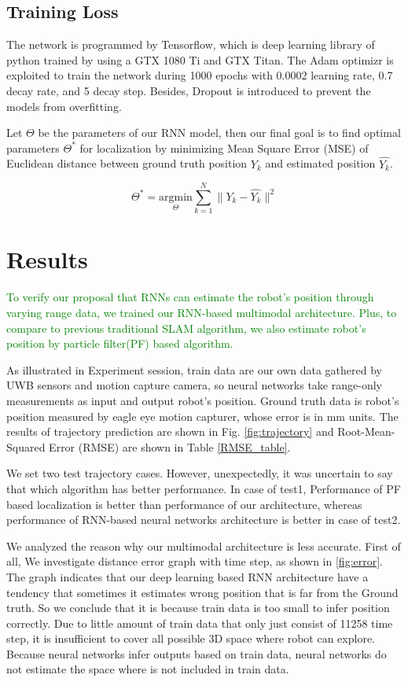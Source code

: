 \documentclass[letterpaper, 10 pt, conference]{ieeeconf}  %
\begin{document}
\subsection{Training Loss}
The network is programmed by Tensorflow, which is deep learning library of python trained by using a GTX 1080 Ti and GTX Titan. The Adam optimizr is exploited to train the network during 1000 epochs with 0.0002 learning rate, 0.7 decay rate, and 5 decay step. Besides, Dropout is introduced to prevent the models from overfitting. 

Let $\Theta$ be the parameters of our RNN model, then our final goal is to find optimal parameters $\Theta^{*}$ for localization by minimizing Mean Square Error (MSE) of Euclidean distance between ground truth position $Y_k$ and estimated position $\hat{Y_k}$.

\begin{equation}
\Theta^{*} = \underset{\Theta}{\mathrm{argmin}} \sum_{k=1}^N \parallel Y_k - \hat{Y_k} \parallel^{2}
\end{equation}  

\section{Results}

 \textcolor{green}{To verify our proposal that RNNs can estimate the robot's position through varying range data, we trained our RNN-based multimodal architecture. Plus, to compare to previous traditional SLAM algorithm, we also estimate robot's position by particle filter(PF) based algorithm.}

 As illustrated in Experiment session, train data are our own data gathered by UWB sensors and motion capture camera, so neural networks take range-only measurements as input and output robot's position. Ground truth data is robot's position measured by eagle eye motion capturer, whose error is in mm units. The results of trajectory prediction are shown in Fig. \ref{fig:trajectory} and Root-Mean-Squared Error (RMSE) are shown in Table \ref{RMSE_table}.

 We set two test trajectory cases. However, unexpectedly, it was uncertain to say that which algorithm has better performance. In case of test1, Performance of PF based localization is better than performance of our architecture, whereas performance of RNN-based neural networks architecture is better in case of test2. 
 
 We analyzed the reason why our multimodal architecture is less accurate. First of all, We investigate distance error graph with time step, as shown in \ref{fig:error}. The graph indicates that our deep learning based RNN architecture have a tendency that sometimes it estimates wrong position that is far from the Ground truth. So we conclude that it is because train data is too small to infer position correctly. Due to little amount of train data that only just consist of 11258 time step, it is insufficient to cover all possible 3D space where robot can explore. Because neural networks infer outputs based on train data, neural networks do not estimate the space where is not included in train data. 
 
\end{document}
